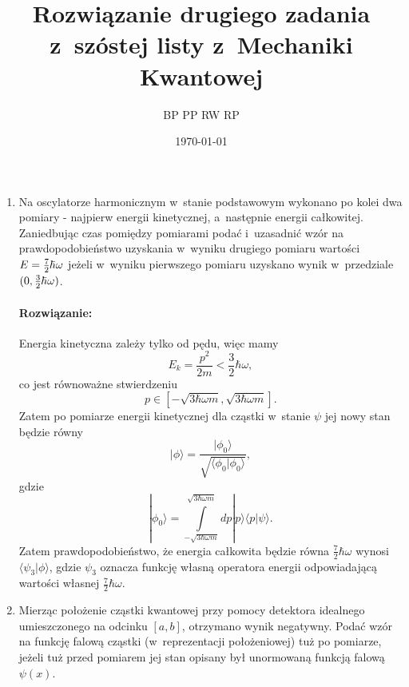 \documentclass{article}
\title{Rozwiązanie drugiego zadania z~szóstej listy z~Mechaniki Kwantowej}
\author{BP PP RW RP}
\date{\today}
\begin{document}
\maketitle

\begin{enumerate}
\item
Na oscylatorze harmonicznym w~stanie podstawowym
wykonano po kolei dwa pomiary -
najpierw energii kinetycznej, a~następnie energii
całkowitej. Zaniedbując czas pomiędzy pomiarami
podać i~uzasadnić wzór na
prawdopodobieństwo uzyskania
w~wyniku drugiego pomiaru wartości
$ E={7\over 2} \; \bar{}\!\!h \omega$ jeżeli w~wyniku
pierwszego pomiaru uzyskano wynik w~przedziale
$(0,{3\over 2}\;\bar{}\!\!h \omega)$.

\paragraph{Rozwiązanie:}
Energia kinetyczna zależy tylko od pędu, więc mamy
\[
E_k = \frac{p^2}{2m} < \frac{3}{2}\hbar\omega \mathrm{,}
\]
co jest równoważne stwierdzeniu
\[
p \in \left[-\sqrt{3\hbar\omega{}m}, \sqrt{3\hbar\omega{}m}\right] \mathrm{.}
\]
Zatem po pomiarze energii kinetycznej dla cząstki w~stanie $\psi$ jej nowy 
stan będzie równy
\[
|\phi\rangle = \frac{|\phi_0\rangle}{\sqrt{\langle\phi_0|\phi_0\rangle}} \mathrm{,}
\]
gdzie
\[
|\phi_0\rangle = \int\limits_{-\sqrt{3\hbar\omega{}m}}^{\sqrt{3\hbar\omega{}m}}
dp|p\rangle\langle{}p|\psi\rangle \mathrm{.}
\]
Zatem prawdopodobieństwo, że energia całkowita będzie równa 
$\frac{7}{2}\hbar\omega$ wynosi $\langle\psi_3|\phi\rangle$,
gdzie $\psi_3$ oznacza funkcję własną operatora energii odpowiadającą wartości
własnej $\frac{7}{2}\hbar\omega$.

\item Mierząc położenie cząstki kwantowej przy pomocy detektora idealnego 
umieszczonego na odcinku
$[a,b]$, otrzymano wynik negatywny. Podać wzór na funkcję falową
cząstki (w~reprezentacji położeniowej) tuż po pomiarze, jeżeli tuż
przed pomiarem jej stan opisany był unormowaną funkcją falową
$\psi(x)$.


\end{enumerate}
\end{document}
